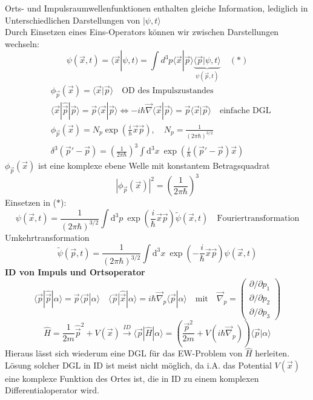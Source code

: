 \documentclass[10pt,article,colorback,accentcolor=tud9d]{scrartcl}
\begin{document}
Orts- und Impulsraumwellenfunktionen enthalten gleiche Information, lediglich in Unterschiedlichen Darstellungen von $|\psi,t\rangle$\\
Durch Einsetzen eines Eins-Operators können wir zwischen Darstellungen wechseln:
\begin{equation}
\psi(\vec{x},t)=\langle\vec{x}|\psi,t)=\int d^3p\langle\vec{x}|\vec{p}\rangle\underbrace{\langle\vec{p}|\psi,t\rangle}_{\psi(\vec{p},t)} \quad (*)
\end{equation}
\begin{align}
&\phi_{\vec{p}}(\vec{x})=\langle\vec{x}|\vec{p}\rangle\quad \text{OD des Impulszustandes}\\
&\langle\vec{x}|\hat{\vec{p}}|\vec{p}\rangle=\vec{p}\langle\vec{x}|\vec{p}\rangle\Leftrightarrow -i\hbar\vec{\nabla}\langle\vec{x}|\vec{p}\rangle=\vec{p}\langle\vec{x}|\vec{p}\rangle\quad\text{einfache DGL}\\
&\phi_{\vec{p}}(\vec{x})=N_p\exp\left(\frac{i}{\hbar}\vec{x}\vec{p}\right), \quad N_p=\frac{1}{(2\pi\hbar)^{3/2}}\\
&\delta^3(\vec{p}'-\vec{p})=\left(\frac{1}{2\pi\hbar}\right)^3\int \mathrm{d}^3x\ \exp\left(\frac{i}{\hbar}(\vec{p}'-\vec{p})\vec{x}\right)
\end{align}
$\phi_{\vec{p}}(\vec{x})$ ist eine komplexe ebene Welle mit konstantem Betragsquadrat
\begin{equation}
\left|\phi_{\vec{p}}(\vec{x})\right|^2=\left(\frac{1}{2\pi\hbar}\right)^3
\end{equation}
Einsetzen in ($*$):
\begin{equation}
\psi(\vec{x},t)=\frac{1}{(2\pi\hbar)^{3/2}}\int\mathrm{d}^3p\ \exp\left(\frac{i}{\hbar}\vec{x}\vec{p}\right)\tilde{\psi}(\vec{x},t)\quad \text{Fouriertransformation}
\end{equation}
Umkehrtransformation
\begin{equation}
\tilde{\psi}(\vec{p},t)=\frac{1}{(2\pi\hbar)^{3/2}}\int\mathrm{d}^3x\ \exp\left(-\frac{i}{\hbar}\vec{x}\vec{p}\right)\psi(\vec{x},t)
\end{equation}
\textbf{ID von Impuls und Ortsoperator}
\begin{equation}
\langle\vec{p}|\hat{\vec{p}}|\alpha\rangle=\vec{p}\langle\vec{p}|\alpha\rangle\quad \langle\vec{p}|\hat{\vec{x}}|\alpha\rangle=i\hbar\vec{\nabla}_p\langle\vec{p}|\alpha\rangle \quad \text{mit}\quad \vec{\nabla}_p=\left(\begin{array}{c} \partial/\partial p_1 \\ \partial/\partial p_2 \\ \partial/\partial p_3\end{array}\right)
\end{equation}
\begin{equation}
\hat{H}=\frac{1}{2m}\hat{\vec{p}}^2+V(\vec{x})\xrightarrow{ID} \langle\vec{p}|\hat{H}|\alpha\rangle=\left(\frac{\vec{p}^2}{2m}+V(i\hbar\vec{\nabla}_p)\right)\langle\vec{p}|\alpha\rangle
\end{equation}
Hieraus lässt sich wiederum eine DGL für das EW-Problem von $\hat{H}$ herleiten. Lösung solcher DGL in ID ist meist nicht möglich, da i.A. das Potential $V(\vec{x})$ eine komplexe Funktion des Ortes ist, die in ID zu einem komplexen Differentialoperator wird.
\end{document}
